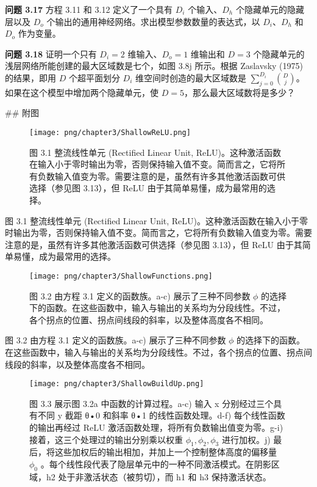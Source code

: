 \textbf{问题 3.17} 方程 3.11 和 3.12 定义了一个具有 \(D_i\) 个输入、\(D_h\) 个隐藏单元的隐藏层以及 \(D_o\) 个输出的通用神经网络。求出模型参数数量的表达式，以 \(D_i\)、\(D_h\) 和 \(D_o\) 作为变量。

\textbf{问题 3.18} 证明一个只有 \(D_i = 2\) 维输入、\(D_o = 1\) 维输出和 \(D = 3\) 个隐藏单元的浅层网络所能创建的最大区域数是七个，如图 3.8j 所示。根据 Zaslavsky (1975) 的结果，即用 \(D\) 个超平面划分 \(D_i\) 维空间时创造的最大区域数是 \(\sum_{j=0}^{D_i} \binom{D}{j}\)。如果在这个模型中增加两个隐藏单元，使 \(D = 5\)，那么最大区域数将是多少？

## 附图

\begin{figure}[h!]
\centering
\texttt{[image: png/chapter3/ShallowReLU.png]}
\caption{图 3.1 整流线性单元 (Rectified Linear Unit, ReLU)。这种激活函数在输入小于零时输出为零，否则保持输入值不变。简而言之，它将所有负数输入值变为零。需要注意的是，虽然有许多其他激活函数可供选择（参见图 3.13），但 ReLU 由于其简单易懂，成为最常用的选择。}
\end{figure}

图 3.1 整流线性单元 (Rectified Linear Unit, ReLU)。这种激活函数在输入小于零时输出为零，否则保持输入值不变。简而言之，它将所有负数输入值变为零。需要注意的是，虽然有许多其他激活函数可供选择（参见图 3.13），但 ReLU 由于其简单易懂，成为最常用的选择。


\begin{figure}[h!]
\centering
\texttt{[image: png/chapter3/ShallowFunctions.png]}
\caption{图 3.2 由方程 3.1 定义的函数族。a-c) 展示了三种不同参数 $\phi$ 的选择下的函数。在这些函数中，输入与输出的关系均为分段线性。不过，各个拐点的位置、拐点间线段的斜率，以及整体高度各不相同。}
\end{figure}

图 3.2 由方程 3.1 定义的函数族。a-c) 展示了三种不同参数 \(\phi\) 的选择下的函数。在这些函数中，输入与输出的关系均为分段线性。不过，各个拐点的位置、拐点间线段的斜率，以及整体高度各不相同。


\begin{figure}[h!]
\centering
\texttt{[image: png/chapter3/ShallowBuildUp.png]}
\caption{图 3.3 展示图 3.2a 中函数的计算过程。a-c) 输入 x 分别经过三个具有不同 y 截距 θ•0 和斜率 θ•1 的线性函数处理。d-f) 每个线性函数的输出再经过 ReLU 激活函数处理，将所有负数输出值变为零。g-i) 接着，这三个处理过的输出分别乘以权重 $\phi_1 , \phi_2 , \phi_3$ 进行加权。j) 最后，将这些加权后的输出相加，并加上一个控制整体高度的偏移量 $\phi_0$ 。每个线性段代表了隐层单元中的一种不同激活模式。在阴影区域，h2 处于非激活状态（被剪切），而 h1 和 h3 保持激活状态。}
\end{figure}


